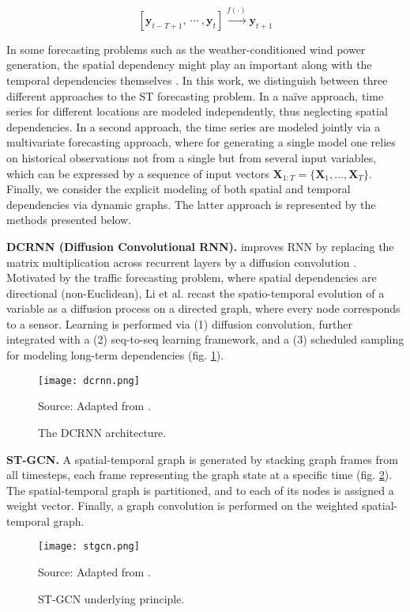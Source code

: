 \begin{equation}\label{eq:stf}
    [\boldsymbol{y}_{t-T+1}, \  \cdots\ , \boldsymbol{y}_{t}] \xrightarrow{f(\cdot)} \boldsymbol{y}_{t+1}
\end{equation}

In some forecasting problems such as the weather-conditioned wind power generation, the spatial dependency might play an important along with the temporal dependencies themselves \cite{engeland2017variability}.
In this work, we distinguish between three different approaches to the ST forecasting problem.
In a naïve approach, time series for different locations are modeled independently, thus neglecting spatial dependencies.
In a second approach, the time series are modeled jointly via a multivariate forecasting approach, where for generating a single model one relies on historical observations not from a single but from several input variables, which can be expressed by a sequence of input vectors $\boldsymbol{X}_{1:T} = \{\boldsymbol{X}_1, ..., \boldsymbol{X}_T\}$.
Finally, we consider the explicit modeling of both spatial and temporal dependencies via dynamic graphs.
The latter approach is represented by the methods presented below.

\vspace{1em}
\noindent
\textbf{DCRNN (Diffusion Convolutional RNN).} improves RNN by replacing the matrix multiplication across recurrent layers by a diffusion convolution \cite{liu2020intro}.
Motivated by the traffic forecasting problem, where spatial dependencies are directional (non-Euclidean), Li et al. \cite{li2018dcrnn} recast the spatio-temporal evolution of a variable as a diffusion process on a directed graph, where every node corresponds to a sensor.
Learning is performed via (1) diffusion convolution, further integrated with a (2) seq-to-seq learning framework, and a (3) scheduled sampling for modeling long-term dependencies (fig. \ref{fig:dcrnn}).
\begin{figure}[H]
	\centering
 	\caption{The DCRNN architecture.}
	\texttt{[image: dcrnn.png]}  \\
    \raggedright
    Source: Adapted from \cite{li2018dcrnn}.
	\label{fig:dcrnn}
\end{figure}

\noindent
\textbf{ST-GCN.} A spatial-temporal graph is generated by stacking graph frames from all timesteps, each frame representing the graph state at a specific time (fig. \ref{fig:stgcn}).
The spatial-temporal graph is partitioned, and to each of its nodes is assigned a weight vector.
Finally, a graph convolution is performed on the weighted spatial-temporal graph.
\begin{figure}[H]
	\centering
 	\caption{ST-GCN underlying principle.}
	\texttt{[image: stgcn.png]}  \\
    \raggedright
    Source: Adapted from \cite{liu2019st-mgcn}.
	\label{fig:stgcn}
\end{figure}

